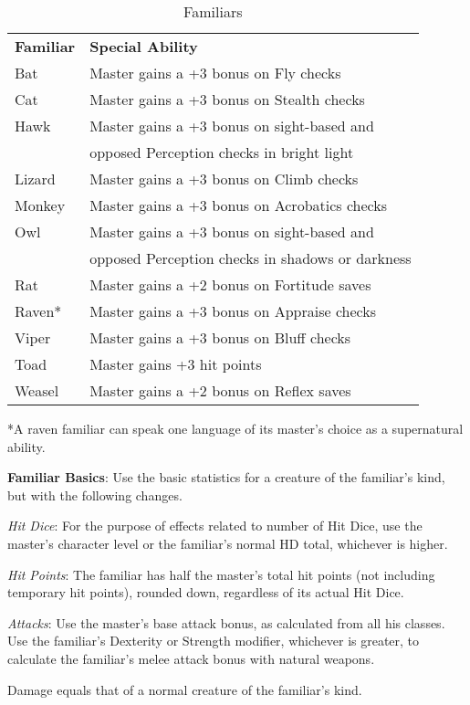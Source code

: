 \begin{table}
 \sffamily
 \caption{Familiars}
 \begin{tabular}{ll}
  \textbf{Familiar} & \textbf{Special Ability} \\
Bat & Master gains a +3 bonus on Fly checks\\
Cat & Master gains a +3 bonus on Stealth checks\\
Hawk & Master gains a +3 bonus on sight-based and \\
     & opposed Perception checks in bright light\\
Lizard & Master gains a +3 bonus on Climb checks\\
Monkey & Master gains a +3 bonus on Acrobatics checks\\
Owl & Master gains a +3 bonus on sight-based and\\
    & opposed Perception checks in shadows or darkness\\
Rat & Master gains a +2 bonus on Fortitude saves\\
Raven* & Master gains a +3 bonus on Appraise checks\\
Viper & Master gains a +3 bonus on Bluff checks\\
Toad & Master gains +3 hit points\\
Weasel & Master gains a +2 bonus on Reflex saves\\
 \end{tabular}
*A raven familiar can speak one language of its master's choice as a supernatural ability.
\end{table}

				
\textbf{Familiar Basics}: Use the basic statistics for a creature of the familiar's kind, but with the following changes.
				
\textit{Hit Dice}: For the purpose of effects related to number of Hit Dice, use the master's character level or the familiar's normal HD total, whichever is higher.
				
\textit{Hit Points}: The familiar has half the master's total hit points (not including temporary hit points), rounded down, regardless of its actual Hit Dice.
				
\textit{Attacks}: Use the master's base attack bonus, as calculated from all his classes. Use the familiar's Dexterity or Strength modifier, whichever is greater, to calculate the familiar's melee attack bonus with natural weapons. 
				
Damage equals that of a normal creature of the familiar's kind.
				
